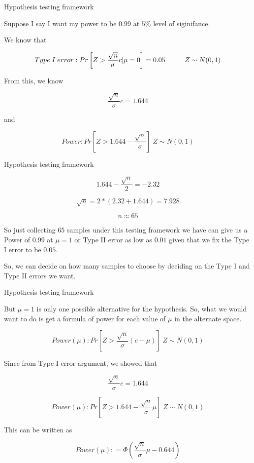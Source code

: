 \documentclass{beamer}\usepackage[]{graphicx}\usepackage[]{color}
\begin{document}
\begin{frame}{Hypothesis testing framework}

Suppose I say I want my power to be $0.99$ at $5\%$ level of siginifance. \pause

We know that 

$$ Type \; I \; error: Pr \left [ Z > \frac{\sqrt{n}}{\sigma}c | \mu=0 \right ] = 0.05  \hspace{1 cm} Z \sim N(0,1) $$  \pause

From this, we know 

$$ \frac{\sqrt{n}}{\sigma}c = 1.644  $$  \pause

and 

$$ Power:  Pr \left [ Z > 1.644 - \frac{\sqrt{n}}{\sigma}  \right] \; Z \sim N(0,1) $$

\end{frame}

\begin{frame}{Hypothesis testing framework}

$$ 1.644 - \frac{\sqrt{n}}{2} =  -2.32 $$ \pause

$$ \sqrt{n} = 2*(2.32+1.644)= 7.928 $$ \pause

$$ n \approx 65$$ \pause

So just collecting $65$ samples under this testing framework we have can give us a Power of $0.99$ at $\mu=1$ or Type II error as low as $0.01$ given that we fix the Type I error to be $0.05$. \pause

So, we can decide on how many samples to choose by deciding on the Type I and Type II errors we want.

\end{frame}


\begin{frame}{Hypothesis testing framework}

But $\mu=1$ is only one possible alternative for the hypothesis. So, what we would want to do is get a formula of power for each value of $\mu$ in the alternate space.

$$ Power(\mu):  Pr \left [ Z > \frac{\sqrt{n}}{\sigma}(c-\mu)  \right] \; Z \sim N(0,1) $$

Since from Type I error argument, we showed that 

$$ \frac{\sqrt{n}}{\sigma}c = 1.644 $$

$$ Power(\mu):  Pr \left [ Z > 1.644 - \frac{\sqrt{n}}{\sigma}\mu  \right] \; Z \sim N(0,1) $$

This can be written as 

$$ Power(\mu): = \Phi \left (\frac{\sqrt{n}}{\sigma}\mu - 0.644 \right) $$

\end{frame}
\end{document}
